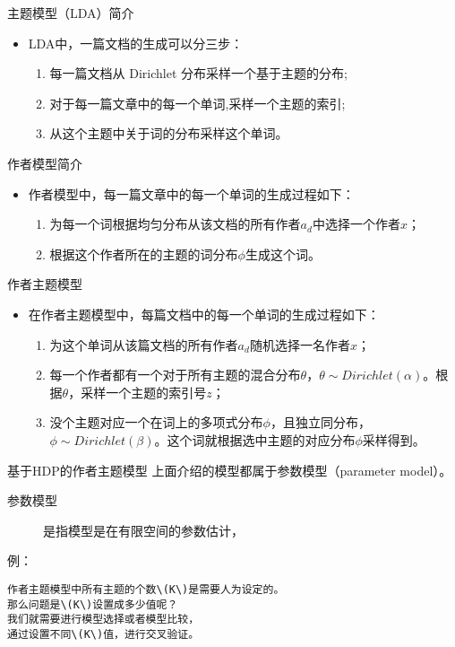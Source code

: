 \documentclass[presentation]{beamer}
\begin{document}
\begin{frame}[label={sec:orgheadline3}]{主题模型（LDA）简介}
\begin{itemize}
\item LDA中，一篇文档的生成可以分三步：
\begin{enumerate}
\item 每一篇文档从 Dirichlet 分布采样一个基于主题的分布;
\item 对于每一篇文章中的每一个单词,采样一个主题的索引;
\item 从这个主题中关于词的分布采样这个单词。
\end{enumerate}
\end{itemize}
\end{frame}
\begin{frame}[label={sec:orgheadline4}]{作者模型简介}
\begin{itemize}
\item 作者模型中，每一篇文章中的每一个单词的生成过程如下：
\begin{enumerate}
\item 为每一个词根据均匀分布从该文档的所有作者\(a_d\)中选择一个作者\(x\)；
\item 根据这个作者所在的主题的词分布\(\phi\)生成这个词。
\end{enumerate}
\end{itemize}
\end{frame}
\begin{frame}[label={sec:orgheadline5}]{作者主题模型}
\begin{itemize}
\item 在作者主题模型中，每篇文档中的每一个单词的生成过程如下：
\begin{enumerate}
\item 为这个单词从该篇文档的所有作者\(a_d\)随机选择一名作者\(x\)；
\item 每一个作者都有一个对于所有主题的混合分布\(\theta\)，\(\theta \sim Dirichlet(\alpha)\)。根据\(\theta\)，采样一个主题的索引号\(z\)；
\item 没个主题对应一个在词上的多项式分布\(\phi\)，且独立同分布，\(\phi \sim Dirichlet(\beta)\)。这个词就根据选中主题的对应分布\(\phi\)采样得到。
\end{enumerate}
\end{itemize}
\end{frame}

\begin{frame}[fragile,label={sec:orgheadline6}]{基于HDP的作者主题模型}
 上面介绍的模型都属于参数模型（parameter model）。
\begin{description}
\item[{参数模型}] 是指模型是在有限空间的参数估计，
\item[{例：}] 
\end{description}
\begin{verbatim}
作者主题模型中所有主题的个数\(K\)是需要人为设定的。
那么问题是\(K\)设置成多少值呢？
我们就需要进行模型选择或者模型比较，
通过设置不同\(K\)值，进行交叉验证。
\end{verbatim}
\end{frame}
\end{document}
